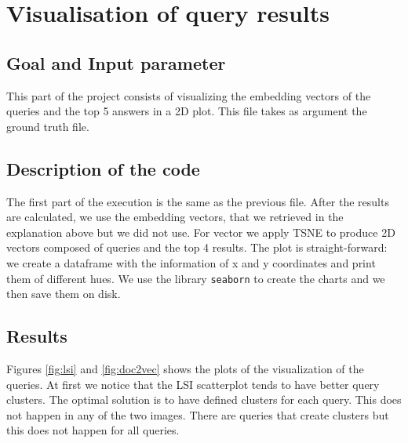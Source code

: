 \documentclass [14 pt]{article}
\begin{document}
\section{Visualisation of query results} %
\subsection{Goal and Input parameter} %
This part of the project consists of visualizing the embedding vectors of the queries and the top 5 answers in a 2D plot.
This file takes as argument the ground truth file.

\subsection{Description of the code} %
The first part of the execution is the same as the previous file. After the results are calculated, we use the embedding vectors, that we retrieved in the explanation above but we did not use. For vector we apply TSNE to produce 2D vectors composed of queries and the top 4 results.
The plot is straight-forward: we create a dataframe with the information of x and y coordinates and print them of different hues. We use the library \texttt{seaborn} to create the charts and we then save them on disk.

\subsection{Results} %
Figures \ref{fig:lsi} and \ref{fig:doc2vec} shows the plots of the visualization of the queries. At first we notice that the LSI scatterplot tends to have better query clusters. The optimal solution is to have defined clusters for each query. This does not happen in any of the two images. There are queries that create clusters but this does not happen for all queries.\\
\end{document}
